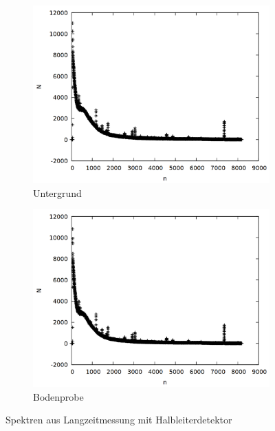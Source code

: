 \begin{figure}[h]
  \centering
  \begin{subfigure}[h]{0.5\textwidth}
    \centering
    \includegraphics[width=\textwidth]{data/untergrund.png}
    \caption{Untergrund}
  \end{subfigure}%
  \begin{subfigure}[h]{0.5\textwidth}
    \centering
    \includegraphics[width=\textwidth]{data/erde_raw.png}
    \caption{Bodenprobe}
  \end{subfigure}
  \caption{Spektren aus Langzeitmessung mit Halbleiterdetektor}
\end{figure}
